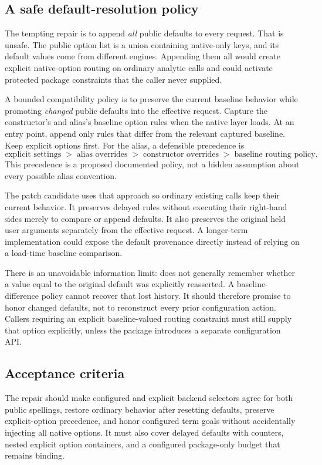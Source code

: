 \documentclass[11pt,a4paper]{article}
\newcommand{\code}[1]{\texttt{\detokenize{#1}}}
\begin{document}
\subsection{A safe default-resolution policy}

The tempting repair is to append \emph{all} public defaults to every request. That is unsafe. The public option list is a union containing native-only keys, and its default values come from different engines. Appending them all would create explicit native-option routing on ordinary analytic calls and could activate protected package constraints that the caller never supplied.

A bounded compatibility policy is to preserve the current baseline behavior while promoting \emph{changed} public defaults into the effective request. Capture the constructor's and alias's baseline option rules when the native layer loads. At an entry point, append only rules that differ from the relevant captured baseline. Keep explicit options first. For the alias, a defensible precedence is
\[
\text{explicit settings}\;>\;\text{alias overrides}\;>\;
\text{constructor overrides}\;>\;\text{baseline routing policy}.
\]
This precedence is a proposed documented policy, not a hidden assumption about every possible alias convention.

The patch candidate uses that approach so ordinary existing calls keep their current behavior. It preserves delayed rules without executing their right-hand sides merely to compare or append defaults. It also preserves the original held user arguments separately from the effective request. A longer-term implementation could expose the default provenance directly instead of relying on a load-time baseline comparison.

There is an unavoidable information limit: \code{SetOptions} does not generally remember whether a value equal to the original default was explicitly reasserted. A baseline-difference policy cannot recover that lost history. It should therefore promise to honor changed defaults, not to reconstruct every prior configuration action. Callers requiring an explicit baseline-valued routing constraint must still supply that option explicitly, unless the package introduces a separate configuration API.

\subsection{Acceptance criteria}

The repair should make configured and explicit backend selectors agree for both public spellings, restore ordinary behavior after resetting defaults, preserve explicit-option precedence, and honor configured term goals without accidentally injecting all native options. It must also cover delayed defaults with counters, nested explicit option containers, and a configured package-only budget that remains binding.
\end{document}

